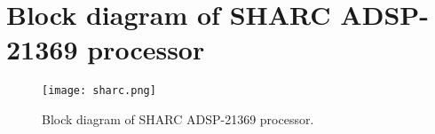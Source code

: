 
\chapter{Block diagram of SHARC ADSP-21369 processor} %

\label{AppendixC} %


\begin{figure}[htbp]
\centering
\texttt{[image: sharc.png]}
\caption{Block diagram of SHARC ADSP-21369 processor.}
\end{figure}

